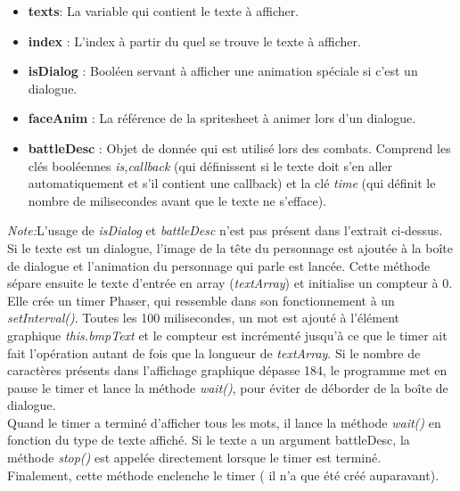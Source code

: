 \documentclass[11pt]{article}
\begin{document}
\begin{itemize}
\item \textbf{texts}: La variable qui contient le texte à afficher.
\item \textbf{index} : L'index à partir du quel se trouve le texte à afficher.
\item \textbf{isDialog} : Booléen servant à afficher une animation spéciale si c'est un dialogue.
\item \textbf{faceAnim} : La référence de la spritesheet à animer lors d'un dialogue.
\item \textbf{battleDesc} : Objet de donnée qui est utilisé lors des combats. Comprend les clés booléennes \textit{is,callback} (qui définissent si le texte doit s'en aller automatiquement et s'il contient une callback) et la clé \textit{time} (qui définit le nombre de milisecondes avant que le texte ne s'efface).
\end{itemize}
\textit{Note:}L'usage de \textit{isDialog} et \textit{battleDesc} n'est pas présent dans l'extrait ci-dessus.\\

Si le texte est un dialogue, l'image de la tête du personnage est ajoutée à la boîte de dialogue et l'animation du personnage qui parle est lancée.
Cette méthode sépare ensuite le texte d'entrée en array (\textit{textArray}) et initialise un compteur à 0. Elle crée un timer Phaser, qui ressemble dans son fonctionnement à un \textit{setInterval()}. Toutes les 100 milisecondes, un mot est ajouté à l'élément graphique \textit{this.bmpText} et le compteur est incrémenté jusqu'à ce que le timer ait fait l'opération autant de fois que la longueur de \textit{textArray}. Si le nombre de caractères présents dans l'affichage graphique dépasse 184, le programme met en pause le timer et lance la méthode \textit{wait()}, pour éviter de déborder de la boîte de dialogue.\\

 Quand le timer a terminé d'afficher tous les mots, il lance la méthode \textit{wait()} en fonction du type de texte affiché. Si le texte a un argument battleDesc, la méthode \textit{stop()} est appelée directement lorsque le timer est terminé.\\
 
Finalement, cette méthode enclenche le timer ( il n'a que été créé auparavant).
 
\end{document}
